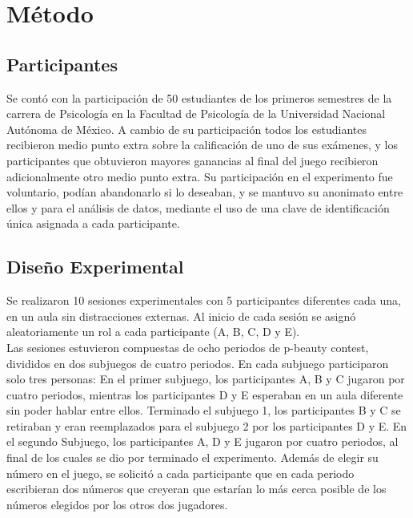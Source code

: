 
\chapter{Método} %

\label{Cap_Exp} %

\section{Participantes}

Se contó con la participación de 50 estudiantes de los primeros semestres de la carrera de Psicología en la Facultad de Psicología de la Universidad Nacional Autónoma de México. A cambio de su participación todos los estudiantes recibieron medio punto extra sobre la  calificación de uno de sus exámenes, y  los participantes que obtuvieron mayores ganancias al final del juego recibieron adicionalmente otro medio punto extra. Su participación en el experimento fue voluntario, podían abandonarlo si lo deseaban, y se mantuvo su anonimato entre ellos y para el análisis de datos, mediante el uso de una clave de identificación única asignada a cada participante.\\

\section{Diseño Experimental}

Se realizaron 10 sesiones experimentales con  5 participantes diferentes cada una, en un aula sin distracciones externas. Al inicio de cada sesión se asignó aleatoriamente un rol a cada participante (A, B, C, D y E).\\

Las sesiones estuvieron compuestas de ocho periodos de p-beauty contest, divididos en dos subjuegos de cuatro periodos. En cada subjuego participaron solo tres personas: En el primer subjuego, los participantes A, B y C jugaron por cuatro periodos, mientras los participantes D y E esperaban en un aula diferente sin poder hablar entre ellos. Terminado el subjuego 1, los participantes B y C se retiraban y eran reemplazados para el subjuego 2 por los participantes D y E. En el segundo Subjuego, los participantes A, D y E jugaron por cuatro periodos, al final de los cuales se dio por terminado el experimento.
Además de elegir su número en el juego, se solicitó a cada participante que en cada periodo escribieran dos números que creyeran que estarían lo más cerca posible de los números elegidos por los otros dos jugadores.\\

